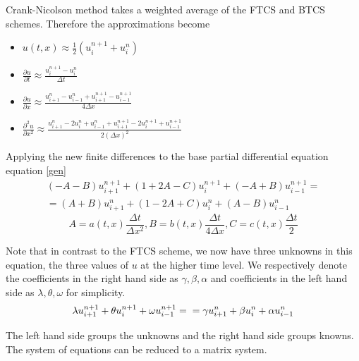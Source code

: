 \documentclass[12pt, oneside]{book}
\theoremstyle{plain}
\theoremstyle{definition}
\begin{document}
Crank-Nicolson method takes a weighted average of the FTCS and BTCS schemes. Therefore the approximations become
\begin{itemize}
 \item $ u(t,x) \approx \frac{1}{2} ( u^{n+1}_i +  u^n_i) $
 \item $   \frac{\partial u}{\partial t} \approx \frac{u^{n+1}_i - u^n_i}{\Delta t} $
 \item $   \frac{\partial u}{\partial x} \approx \frac{u^n_{i+1} - u^n_{i-1} + u^{n+1}_{i+1} - u^{n+1}_{i-1}}{4\Delta x} $
 \item $ \frac{\partial^2 u}{\partial x^2} \approx \frac{u^n_{i+1}- 2u^n_i + u^n_{i-1} + u^{n+1}_{i+1}- 2u^{n+1}_i + u^{n+1}_{i-1}}{2(\Delta x)^2} $
\end{itemize}

Applying the new finite differences to the base partial differential equation equation \ref{gen}
\begin{multline}
 (-A -B) u^{n+1}_{i+1} + (1 + 2A - C) u^{n+1}_i + (-A + B) u^{n+1}_{i-1} =  \\
=  (A+B) u^{n}_{i+1} + (1 - 2A + C) u^{n}_i + (A - B) u^{n}_{i-1}
\end{multline}
$$ A = a(t,x) \frac{\Delta t}{\Delta x^2},  B = b(t,x) \frac{\Delta t}{4\Delta x}, C = c(t,x) \frac{\Delta t}{2}$$ 

Note that in contrast to the FTCS scheme, we now have three unknowns in this equation, the three values of $u$ at the higher time level.  We respectively denote the coefficients in the right hand side as $\gamma, \beta, \alpha$ and coefficients in the left hand side as $\lambda, \theta, \omega$ for simplicity.
\begin{equation}
\lambda u^{n+1}_{i+1} + \theta u^{n+1}_i + \omega u^{n+1}_{i-1} =  \\
=  \gamma u^{n}_{i+1} + \beta u^{n}_i + \alpha u^{n}_{i-1}
\end{equation}

The left hand side groups the unknowns and the right hand side groups knowns. The system of equations can be  reduced to a matrix system. 
\end{document}
